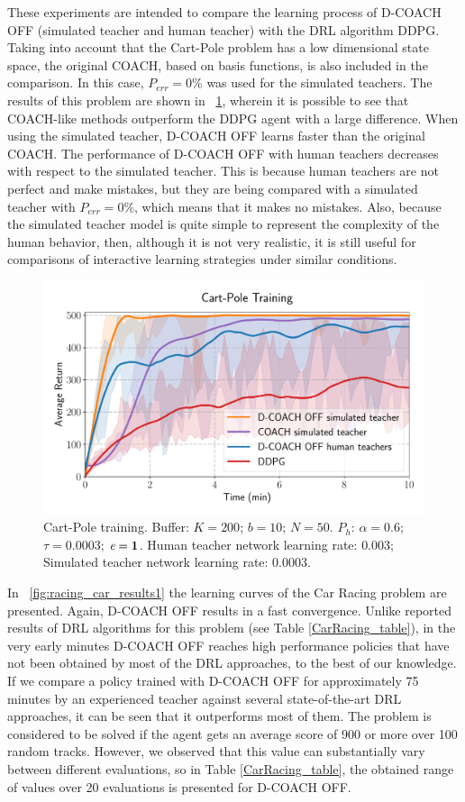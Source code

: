 These experiments are intended to compare the learning process of D-COACH OFF (simulated teacher and human teacher) with the DRL algorithm DDPG. Taking into account that the Cart-Pole problem has a low dimensional state space, the original COACH, based on basis functions, is also included in the comparison. In this case, $P_\mathit{err}=0\%$ was used for the simulated teachers. The results of this problem are shown in \figurename~{\ref{fig:cartpole_results}}, wherein it is possible to see that COACH-like methods outperform the DDPG agent with a large difference. When using the simulated teacher, D-COACH OFF learns faster than the original COACH. The performance of D-COACH OFF with human teachers decreases with respect to the simulated teacher. This is because human teachers are not perfect and make mistakes, but they are being compared with a simulated teacher with $P_\mathit{err}=0\%$, which means that it makes no mistakes. Also, because the simulated teacher model is quite simple to represent the complexity of the human behavior, then, although it is not very realistic, it is still useful for comparisons of interactive learning strategies under similar conditions.

\begin{figure}[h]
    \centering
    \includegraphics[width=0.7\linewidth]{imagenes/cap3/offline_cart_pole_humans.pdf}
    \caption[Cart-Pole training.]{Cart-Pole training. Buffer: $K = 200$; $b = 10$; $N = 50$. $P_{h}$: $\alpha = 0.6$; $\tau = 0.0003$; $\emph{e}=\textbf{1}$. Human teacher network learning rate: $0.003$; Simulated teacher network learning rate: $0.0003$.}
    \label{fig:cartpole_results}
\end{figure}

In \figurename~{\ref{fig:racing_car_results1}} the learning curves of the Car Racing problem are presented. Again, D-COACH OFF results in a fast convergence. Unlike reported results of DRL algorithms for this problem (see Table \ref{CarRacing_table}), in the very early minutes D-COACH OFF reaches high performance policies that have not been obtained by most of the DRL approaches, to the best of our knowledge. If we compare a policy trained with D-COACH OFF for approximately 75 minutes by an experienced teacher against several state-of-the-art DRL approaches, it can be seen that it outperforms most of them. The problem is considered to be solved if the agent gets an average score of 900 or more over 100 random tracks. However, we observed that this value can substantially vary between different evaluations, so in Table \ref{CarRacing_table}, the obtained range of values over 20 evaluations is presented for D-COACH OFF.

